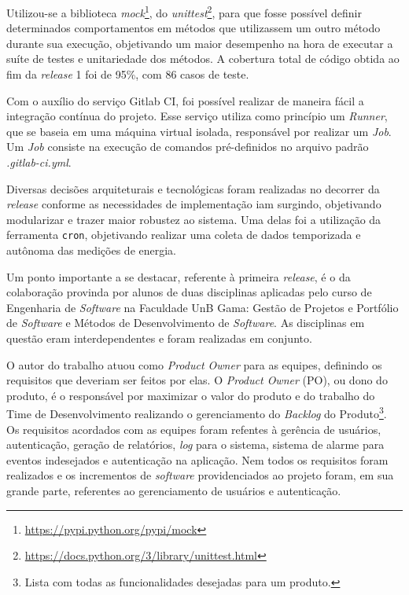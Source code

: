 Utilizou-se a biblioteca \textit{mock}\footnote{\url{https://pypi.python.org/pypi/mock}}, do \textit{unittest}\footnote{\url{https://docs.python.org/3/library/unittest.html}}, para que fosse possível definir determinados comportamentos em métodos que utilizassem um outro método durante sua execução, objetivando um maior desempenho na hora de executar a suíte de testes e unitariedade dos métodos. A cobertura total de código obtida ao fim da \textit{release} 1 foi de 95\%, com 86 casos de teste.

Com o auxílio do serviço Gitlab CI, foi possível realizar de maneira fácil a integração contínua do projeto. Esse serviço utiliza como princípio um \textit{Runner}, que se baseia em uma máquina virtual isolada, responsável por realizar um \textit{Job}. Um \textit{Job} consiste na execução de comandos pré-definidos no arquivo padrão \textit{.gitlab-ci.yml}.

Diversas decisões arquiteturais e tecnológicas foram realizadas no decorrer da \textit{release} conforme as necessidades de implementação iam surgindo, objetivando modularizar e trazer maior robustez ao sistema. Uma delas foi a utilização da ferramenta \verb|cron|, objetivando realizar uma coleta de dados temporizada e autônoma das medições de energia.

Um ponto importante a se destacar, referente à primeira \textit{release}, é o da colaboração provinda por alunos de duas disciplinas aplicadas pelo curso de Engenharia de \textit{Software} na Faculdade  UnB Gama: Gestão de Projetos e Portfólio de \textit{Software} e Métodos de Desenvolvimento de \textit{Software}. As disciplinas em questão eram interdependentes e foram realizadas em conjunto.

O autor do trabalho atuou como \textit{Product Owner} \cite{scrum_guide} para as equipes, definindo os requisitos que deveriam ser feitos por elas. O \textit{Product Owner} (PO), ou dono do produto, é o responsável por maximizar o valor do produto e do trabalho do Time de Desenvolvimento realizando o gerenciamento do \textit{Backlog} do Produto\footnote{Lista com todas as funcionalidades desejadas para um produto.}. Os requisitos acordados com as equipes foram refentes à gerência de usuários, autenticação, geração de relatórios, \textit{log} para o sistema, sistema de alarme para eventos indesejados e autenticação na aplicação. Nem todos os requisitos foram realizados e os incrementos de \textit{software} providenciados ao projeto foram, em sua grande parte, referentes ao gerenciamento de usuários e autenticação.

